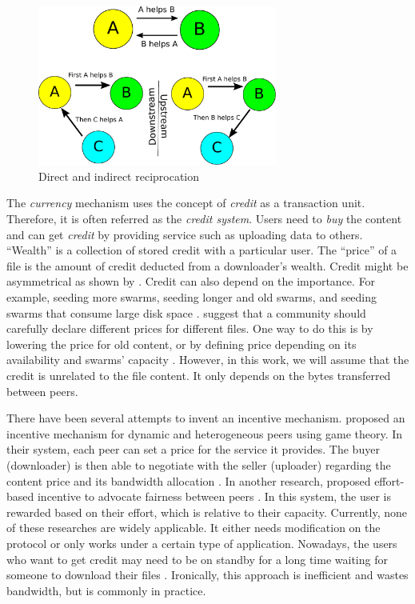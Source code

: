 \begin{figure}[t]
	\centering
	\includegraphics[width=0.7\textwidth]{pics/reciprocation.pdf}
	\caption{Direct and indirect reciprocation}
	\label{fig:reciprocation}
\end{figure}

The \textit{currency} mechanism uses the concept of \textit{credit} as a transaction unit. Therefore, it is often referred as the \textit{credit system}. Users need to \textit{buy} the content and can get \textit{credit} by providing service such as uploading data to others. ``Wealth'' is a collection of stored credit with a particular user. The ``price'' of a file is the amount of credit deducted from a downloader's wealth. Credit might be asymmetrical as shown by \citeauthor{2012:economicbt:kash}\cite{2012:economicbt:kash}. Credit can also depend on the importance. For example, seeding more swarms, seeding longer and old swarms, and seeding swarms that consume large disk space \cite{2014:sustainabilitytorrent:chen}. \citeauthor{2012:economicbt:kash} suggest that a community should carefully declare different prices for different files. One way to do this is by lowering the price for old content, or by defining price depending on its availability and swarms' capacity \cite{2012:economicbt:kash}. However, in this work, we will assume that the credit is unrelated to the file content. It only depends on the bytes transferred between peers.

There have been several attempts to invent an incentive mechanism. \citeauthor{2015:incentivep2pgame:kang} proposed an incentive mechanism for dynamic and heterogeneous peers using game theory. In their system, each peer can set a price for the service it provides. The buyer (downloader) is then able to negotiate with the seller (uploader) regarding the content price and its bandwidth allocation \cite{2015:incentivep2pgame:kang}. In another research, \citeauthor{2010:effortincentive:rahman} proposed effort-based incentive to advocate fairness between peers \cite{2010:effortincentive:rahman}. In this system, the user is rewarded based on their effort, which is relative to their capacity. Currently, none of these researches are widely applicable. It either needs modification on the protocol or only works under a certain type of application. Nowadays, the users who want to get credit may need to be on standby for a long time waiting for someone to download their files \cite{2013:survivepriv:jia}. Ironically, this approach is inefficient and wastes bandwidth, but is commonly in practice\cite{2013:survivepriv:jia}.

